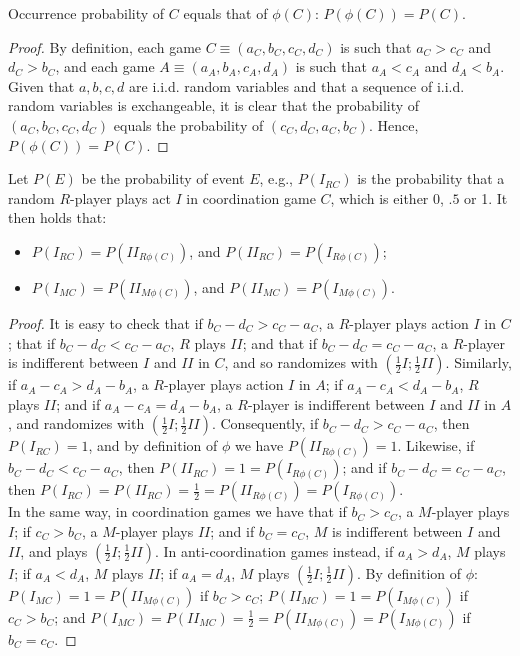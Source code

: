 \documentclass[fleqn,reqno,11pt]{article}
\begin{document}
\begin{lemma} \label{lemma:probabilities coord-ant}
Occurrence probability of $C$ equals that of $\phi(C)$: $P(\phi(C))=P(C)$.
\end{lemma}

\begin{proof}
  By definition, each game $C\equiv(a_{C},b_{C},c_{C},d_{C})$ is such that $a_{C}>c_{C}$ and
  $d_{C}>b_{C}$, and each game $A\equiv(a_{A},b_{A},c_{A},d_{A})$ is such that $a_{A}<c_{A}$
  and $d_{A}<b_{A}$. Given that $a,b,c,d$ are i.i.d. random variables and that a sequence of
  i.i.d. random variables is exchangeable, it is clear that the probability of
  $(a_{C},b_{C},c_{C},d_{C})$ equals the probability of $(c_{C},d_{C},a_{C},b_{C})$.  Hence,
  $P(\phi(C))=P(C)$.
\end{proof}

\begin{lemma} \label{lemma:probabilities actions coord-ant} Let $P(E)$ be the probability of
  event $E$, e.g., $P(I_{RC})$ is the probability that a random $R$-player plays act $I$ in coordination game $C$, which is either 0, $.5$ or 1.  It then holds that:
\begin{itemize}
\item $P(I_{RC})=P(II_{R\phi(C)})$, and $P(II_{RC})=P(I_{R\phi(C)})$;
\item $P(I_{MC})=P(II_{M\phi(C)})$, and $P(II_{MC})=P(I_{M\phi(C)})$.
\end{itemize}
\end{lemma}

\begin{proof}
  It is easy to check that if $b_{C}-d_{C}>c_{C}-a_{C}$, a $R$-player plays action $I$ in $C$;
  that if $b_{C}-d_{C}<c_{C}-a_{C}$, $R$ plays $II$; and that if $b_{C}-d_{C}=c_{C}-a_{C}$, a
  $R$-player is indifferent between $I$ and $II$ in $C$, and so randomizes with
  $(\frac{1}{2}I;\frac{1}{2}II)$. Similarly, if $a_{A}-c_{A}>d_{A}-b_{A}$, a $R$-player plays
  action $I$ in $A$; if $a_{A}-c_{A}<d_{A}-b_{A}$, $R$ plays $II$; and if
  $a_{A}-c_{A}=d_{A}-b_{A}$, a $R$-player is indifferent between $I$ and $II$ in $A$, and
  randomizes with $(\frac{1}{2}I;\frac{1}{2}II)$. Consequently, if $b_{C}-d_{C}>c_{C}-a_{C}$,
  then $P(I_{RC})=1$, and by definition of $\phi$ we have $P(II_{R\phi(C)})=1$. Likewise, if
  $b_{C}-d_{C}<c_{C}-a_{C}$, then $P(II_{RC})=1=P(I_{R\phi(C)})$; and if
  $b_{C}-d_{C}=c_{C}-a_{C}$,
  then $P(I_{RC})=P(II_{RC})=\frac{1}{2}=P(II_{R\phi(C)})=P(I_{R\phi(C)})$. \\
  In the same way, in coordination games we have that if $b_{C}>c_{C}$, a $M$-player plays $I$;
  if $c_{C}>b_{C}$, a $M$-player plays $II$; and if $b_{C}=c_{C}$, $M$ is indifferent between
  $I$ and $II$, and plays $(\frac{1}{2}I;\frac{1}{2}II)$. In anti-coordination games instead,
  if $a_{A}>d_{A}$, $M$ plays $I$; if $a_{A}<d_{A}$, $M$ plays $II$; if $a_{A}=d_{A}$, $M$
  plays $(\frac{1}{2}I;\frac{1}{2}II)$.  By definition of $\phi$:
  $P(I_{MC})=1=P(II_{M\phi(C)})$ if $b_{C}>c_{C}$; $P(II_{MC})=1=P(I_{M\phi(C)})$ if
  $c_{C}>b_{C}$; and $P(I_{MC})=P(II_{MC})=\frac{1}{2}=P(II_{M\phi(C)})=P(I_{M\phi(C)})$ if
  $b_{C}=c_{C}$.
\end{proof}
\end{document}
